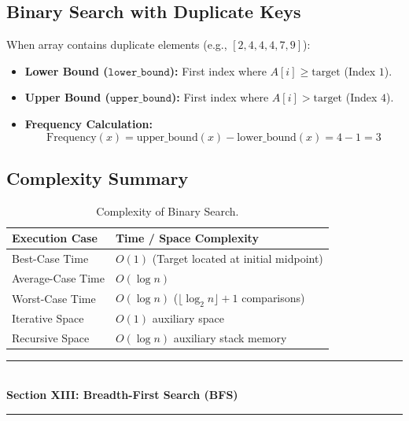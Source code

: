 \subsection{Binary Search with Duplicate Keys}
When array contains duplicate elements (e.g., $[2, 4, 4, 4, 7, 9]$):
\begin{itemize}
    \item \textbf{Lower Bound ($\texttt{lower\_bound}$):} First index where $A[i] \geq \text{target}$ (Index $1$).
    \item \textbf{Upper Bound ($\texttt{upper\_bound}$):} First index where $A[i] > \text{target}$ (Index $4$).
    \item \textbf{Frequency Calculation:}
    \[
    \boxed{\text{Frequency}(x) = \text{upper\_bound}(x) - \text{lower\_bound}(x) = 4 - 1 = 3}
    \]
\end{itemize}

\subsection{Complexity Summary}

\begin{table}[htbp]
\centering
\small
\begin{tabularx}{\textwidth}{l X}
\toprule
\textbf{Execution Case} & \textbf{Time / Space Complexity} \\
\midrule
Best-Case Time          & $O(1)$ (Target located at initial midpoint) \\
Average-Case Time       & $O(\log n)$ \\
Worst-Case Time         & $\boxed{O(\log n)}$ ($\lfloor \log_2 n \rfloor + 1$ comparisons) \\
Iterative Space         & $\boxed{O(1)}$ auxiliary space \\
Recursive Space         & $O(\log n)$ auxiliary stack memory \\
\bottomrule
\end{tabularx}
\caption{Complexity of Binary Search.}
\end{table}

\newpage
\begin{center}
\vspace{0.5em}
{\color{primary}\rule{0.45\textwidth}{1.2pt}}\\[4pt]
{\Large\bfseries\color{primary} Section XIII: Breadth-First Search (BFS)}\\[2pt]
{\color{primary}\rule{0.45\textwidth}{1.2pt}}
\vspace{0.5em}
\end{center}

